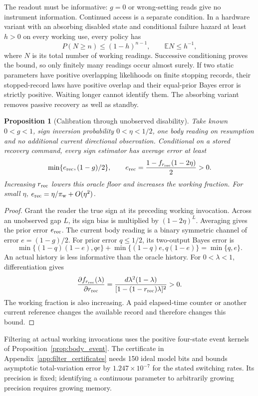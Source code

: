 \documentclass[12pt]{article}
\newtheorem{proposition}[theorem]{Proposition}
\theoremstyle{definition}
\newcommand{\E}{\mathbb E}
\begin{document}
The readout must be informative: $g=0$ or wrong-setting reads give no instrument information. Continued access is a separate condition. In a hardware variant with an absorbing disabled state and conditional failure hazard at least $h>0$ on every working use, every policy has
\[
 P(N\ge n)\le(1-h)^{n-1},\qquad \E N\le h^{-1},
\]
where $N$ is its total number of working readings. Successive conditioning proves the bound, so only finitely many readings occur almost surely. If two static parameters have positive overlapping likelihoods on finite stopping records, their stopped-record laws have positive overlap and their equal-prior Bayes error is strictly positive. Waiting longer cannot identify them. The absorbing variant removes passive recovery as well as standby.

\begin{proposition}[Calibration through unobserved disability]
\label{prop:body_blackout}
Take known $0<g<1$, sign inversion probability $0<\eta<1/2$, one body reading on resumption and no additional current directional observation. Conditional on a stored recovery command, every sign estimator has average error at least
\[
 \min\{e_{\rm rec},(1-g)/2\},\qquad
 e_{\rm rec}=\frac{1-f_{r_{\rm rec}}(1-2\eta)}2>0.
\]
Increasing $r_{\rm rec}$ lowers this oracle floor and increases the working fraction.
For small $\eta$, $e_{\rm rec}=\eta/\pi_{\rm w}+O(\eta^2)$.
\end{proposition}
\begin{proof}
Grant the reader the true sign at its preceding working invocation. Across an unobserved gap $L$, its sign bias is multiplied by $(1-2\eta)^L$. Averaging gives the prior error $e_{\rm rec}$. The current body reading is a binary symmetric channel of error $e=(1-g)/2$. For prior error $q\le1/2$, its two-output Bayes error is
\[
 \min\{(1-q)(1-e),qe\}+
 \min\{(1-q)e,q(1-e)\}=\min\{q,e\}.
\]
An actual history is less informative than the oracle history. For $0<\lambda<1$, differentiation gives
\[
 \frac{\partial f_{r_{\rm rec}}(\lambda)}{\partial r_{\rm rec}}
 =\frac{d\lambda^2(1-\lambda)}{[1-(1-r_{\rm rec})\lambda]^2}>0.
\]
The working fraction is also increasing. A paid elapsed-time counter or another current reference changes the available record and therefore changes this bound.
\end{proof}

Filtering at actual working invocations uses the positive four-state
event kernels of Proposition~\ref{prop:body_event}. The certificate in
Appendix~\ref{app:filter_certificates} needs 150 ideal model bits and bounds
asymptotic total-variation error by $1.247\times10^{-7}$ for the stated
switching rates. Its precision is fixed; identifying a continuous
parameter to arbitrarily growing precision requires growing memory.
\end{document}
